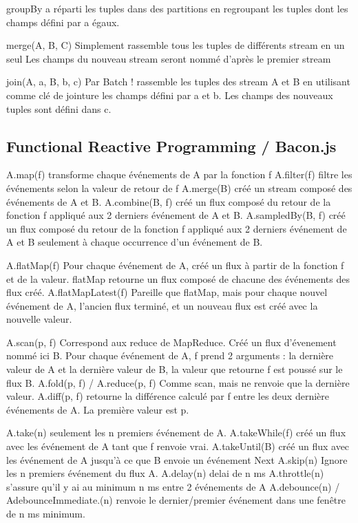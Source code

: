       groupBy a
        réparti les tuples dans des partitions en regroupant les tuples dont les champs défini par a égaux.

      merge(A, B, C)
        Simplement rassemble tous les tuples de différents stream en un seul
        Les champs du nouveau stream seront nommé d'après le premier stream

      join(A, a, B, b, c)
        Par Batch ! rassemble les tuples des stream A et B en utilisant comme clé de jointure les champs défini par a et b.
        Les champs des nouveaux tuples sont défini dans c.


  \subsection{Functional Reactive Programming / Bacon.js}

    A.map(f) 
      transforme chaque événements de A par la fonction f
    A.filter(f)
      filtre les événements selon la valeur de retour de f
    A.merge(B)
      créé un stream composé des événements de A et B.
    A.combine(B, f)
      créé un flux composé du retour de la fonction f appliqué aux 2 derniers événement de A et B.
    A.sampledBy(B, f)
      créé un flux composé du retour de la fonction f appliqué aux 2 derniers événement de A et B seulement à chaque occurrence d'un événement de B.

    A.flatMap(f)
      Pour chaque événement de A, créé un flux à partir de la fonction f et de la valeur.
      flatMap retourne un flux composé de chacune des événements des flux créé.
    A.flatMapLatest(f)
      Pareille que flatMap, mais pour chaque nouvel événement de A, l'ancien flux terminé, et un nouveau flux est créé avec la nouvelle valeur.

    A.scan(p, f)
      Correspond aux reduce de MapReduce.
      Créé un flux d'évenement nommé ici B.
      Pour chaque événement de A, f prend 2 arguments : la dernière valeur de A et la dernière valeur de B, la valeur que retourne f est poussé sur le flux B.
    A.fold(p, f) / A.reduce(p, f)
      Comme scan, mais ne renvoie que la dernière valeur.
    A.diff(p, f)
      retourne la différence calculé par f entre les deux dernière événements de A.
      La première valeur est p.

    A.take(n)
      seulement les n premiers événement de A.
    A.takeWhile(f)
      créé un flux avec les événement de A tant que f renvoie vrai.
    A.takeUntil(B)
      créé un flux avec les événement de A jusqu'à ce que B envoie un événement Next
    A.skip(n)
      Ignore les n premiers événement du flux A.
    A.delay(n)
      delai de n ms
    A.throttle(n)
      s'assure qu'il y ai au minimum n ms entre 2 événements de A
    A.debounce(n) / AdebounceImmediate.(n)
      renvoie le dernier/premier événement dans une fenêtre de n ms minimum.

